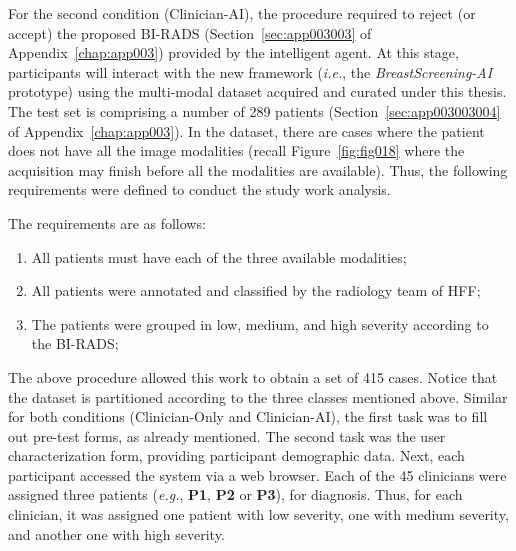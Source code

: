 For the second condition (Clinician-AI), the procedure required to reject (or accept) the proposed \ac{BI-RADS} (Section~\ref{sec:app003003} of Appendix~\ref{chap:app003}) provided by the intelligent agent.
At this stage, participants will interact with the new framework ({\it i.e.}, the {\it BreastScreening-AI} prototype) using the multi-modal dataset acquired and curated under this thesis.
The test set is comprising a number of 289 patients (Section~\ref{sec:app003003004} of Appendix~\ref{chap:app003}).
In the dataset, there are cases where the patient does not have all the image modalities (recall Figure~\ref{fig:fig018} where the acquisition may finish before all the modalities are available).
Thus, the following requirements were defined to conduct the study work analysis.

\vspace{2.00mm}

\noindent
The requirements are as follows:

\vspace{0.05mm}

\begin{enumerate}
\item All patients must have each of the three available modalities;
\item All patients were annotated and classified by the radiology team of \acs{HFF};
\item The patients were grouped in low, medium, and high severity according to the \ac{BI-RADS};
\end{enumerate}

\vspace{0.05mm}

The above procedure allowed this work to obtain a set of 415 cases.
Notice that the dataset is partitioned according to the three classes mentioned above.
Similar for both conditions (Clinician-Only and Clinician-AI), the first task was to fill out pre-test forms, as already mentioned.
The second task was the user characterization form, providing participant demographic data.
Next, each participant accessed the system via a web browser.
Each of the 45 clinicians were assigned three patients ({\it e.g.}, {\bf P1}, {\bf P2} or {\bf P3}), for diagnosis.
Thus, for each clinician, it was assigned one patient with low severity, one with medium severity, and another one with high severity.

